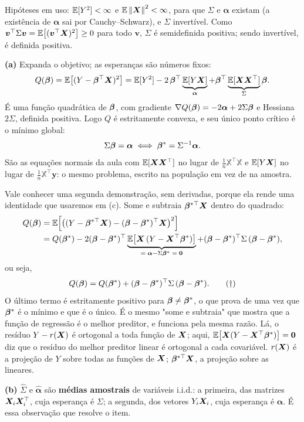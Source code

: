 \begin{solucao}
Hipóteses em uso: $\mathbb{E}[Y^2]<\infty$ e $\mathbb{E}\left\lVert \bm{X} \right\rVert^2<\infty$, para que $\Sigma$ e
$\bm\alpha$ existam (a existência de $\bm\alpha$ sai por Cauchy--Schwarz), e $\Sigma$
invertível. Como $\bm v^\top\Sigma\bm v=\mathbb{E}\big[(\bm v^\top\bm{X})^2\big]\ge0$ para todo
$\bm v$, $\Sigma$ é semidefinida positiva; sendo invertível, é definida positiva.

\smallskip
\textbf{(a)} Expanda o objetivo; as esperanças são números fixos:
\[
  Q(\bm{\beta})=\mathbb{E}\big[(Y-\bm{\beta}^\top\bm{X})^2\big]
  =\mathbb{E}[Y^2]-2\,\bm{\beta}^\top\underbrace{\mathbb{E}[Y\bm{X}]}_{\bm\alpha}
   +\bm{\beta}^\top\underbrace{\mathbb{E}[\bm{X}\bm{X}^\top]}_{\Sigma}\bm{\beta} .
\]
É uma função quadrática de $\bm{\beta}$, com gradiente $\nabla Q(\bm{\beta})=-2\bm\alpha+2\Sigma\bm{\beta}$
e Hessiana $2\Sigma$, definida positiva. Logo $Q$ é estritamente convexa, e seu único
ponto crítico é o mínimo global:
\[
  \Sigma\bm{\beta}=\bm\alpha
  \iff
  \bm{\beta}^\ast=\Sigma^{-1}\bm\alpha .
\]
São as equações normais da aula com $\mathbb{E}[\bm{X}\bm{X}^\top]$ no lugar de
$\frac1n\mathbb{X}^\top\mathbb{X}$ e $\mathbb{E}[Y\bm{X}]$ no lugar de $\frac1n\mathbb{X}^\top\bm y$:
o mesmo problema, escrito na população em vez de na amostra.

Vale conhecer uma segunda demonstração, sem derivadas, porque ela rende uma identidade
que usaremos em (c). Some e subtraia $\bm{\beta}^{\ast\top}\bm{X}$ dentro do quadrado:
\[
\begin{aligned}
  Q(\bm{\beta})
  &=\mathbb{E}\Big[\big((Y-\bm{\beta}^{\ast\top}\bm{X})-(\bm{\beta}-\bm{\beta}^\ast)^\top\bm{X}\big)^2\Big]\\
  &=Q(\bm{\beta}^\ast)
   -2(\bm{\beta}-\bm{\beta}^\ast)^\top\underbrace{\mathbb{E}\big[\bm{X}\,(Y-\bm{X}^\top\bm{\beta}^\ast)\big]}_{=\;\bm\alpha-\Sigma\bm{\beta}^\ast\;=\;\bm 0}
   +(\bm{\beta}-\bm{\beta}^\ast)^\top\Sigma\,(\bm{\beta}-\bm{\beta}^\ast),
\end{aligned}
\]
ou seja,
\[
  Q(\bm{\beta})=Q(\bm{\beta}^\ast)+(\bm{\beta}-\bm{\beta}^\ast)^\top\Sigma\,(\bm{\beta}-\bm{\beta}^\ast).
  \tag{$\dagger$}
\]
O último termo é estritamente positivo para $\bm{\beta}\neq\bm{\beta}^\ast$, o que prova de uma
vez que $\bm{\beta}^\ast$ é o mínimo e que é o único. É o mesmo "some e subtraia" que
mostra que a função de regressão é o melhor preditor, e funciona pela mesma razão. Lá,
o resíduo $Y-r(\bm{X})$ é ortogonal a toda função de $\bm{X}$; aqui, $\mathbb{E}\big[\bm{X}(Y-\bm{X}^\top\bm{\beta}^\ast)\big]=\bm0$ diz
que o resíduo do melhor preditor linear é ortogonal a cada covariável. $r(\bm{X})$ é a
projeção de $Y$ sobre todas as funções de $\bm{X}$; $\bm{\beta}^{\ast\top}\bm{X}$, a projeção sobre
as lineares.

\smallskip
\textbf{(b)} $\widehat\Sigma$ e $\widehat{\bm\alpha}$ são \textbf{médias amostrais} de
variáveis i.i.d.: a primeira, das matrizes $\bm{X}_i\bm{X}_i^\top$, cuja esperança é $\Sigma$;
a segunda, dos vetores $Y_i\bm{X}_i$, cuja esperança é $\bm\alpha$. É essa observação que
resolve o item.


\end{solucao}
